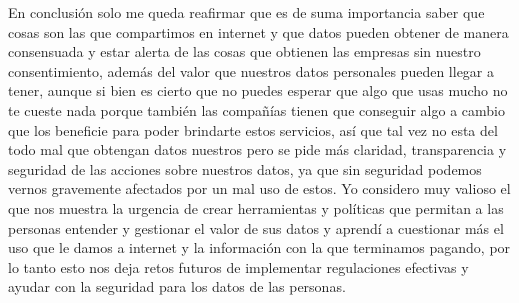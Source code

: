 \documentclass[12pt]{report}
\begin{document}
\begin{enumerate}[label=\textbf{\arabic*.}, leftmargin=*]
\begin{enumerate}[label=\textbf{\alph*.}, leftmargin=*, itemsep=1.0em]
En conclusión solo me queda reafirmar que es de suma importancia saber que cosas son las que compartimos en internet y que datos pueden obtener de manera consensuada y estar alerta de las cosas que obtienen las empresas sin nuestro consentimiento, además del valor que nuestros datos personales pueden llegar a tener, aunque si bien es cierto que no puedes esperar que algo que usas mucho no te cueste nada porque también las compañías tienen que conseguir algo a cambio que los beneficie para poder brindarte estos servicios, así que tal vez no esta del todo mal que obtengan datos nuestros pero se pide más claridad, transparencia y seguridad de las acciones sobre nuestros datos, ya que sin seguridad podemos vernos gravemente afectados por un mal uso de estos. Yo considero muy valioso el que nos muestra la urgencia de crear herramientas y políticas que permitan a las personas entender y gestionar el valor de sus datos y aprendí a cuestionar más el uso que le damos a internet y la información con la que terminamos pagando, por lo tanto esto nos deja retos futuros de implementar regulaciones efectivas y ayudar con la seguridad para los datos de las personas.
\end{enumerate}

\end{enumerate}
\end{document}
